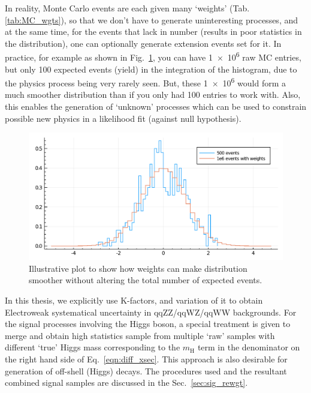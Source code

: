 In reality, Monte Carlo events are each given many `weights' (Tab. \ref{tab:MC_wgts}), so that
we don't have to generate uninteresting processes, and at the same time, for the events that lack
in number (results in poor statistics in the distribution), one can optionally generate
extension events set for it. In practice, for example as shown in Fig.~\ref{fig:wgt_demo}, 
you can have \num{1e6} raw MC entries, but only
100 expected events (yield) in the integration of the histogram, 
due to the physics process being very rarely seen. But,
these \num{1e6} would form a much smoother distribution than if you only had 100 entries to work with.
Also, this enables the generation of `unknown' processes which can
be used to constrain possible new physics in a likelihood fit (against null hypothesis).

\begin{figure}[hb]
\begin{center}
\includegraphics[width=.8\linewidth]{fig/demo_wgts.pdf}
\end{center}
\caption{Illustrative plot to show how weights can make distribution smoother without altering
the total number of expected events.}
\label{fig:wgt_demo}
\end{figure}

In this thesis, we explicitly use K-factors, and variation of it to 
obtain Electroweak systematical uncertainty in qqZZ/qqWZ/qqWW backgrounds. For the signal processes involving
the Higgs boson, a special treatment is given to merge and obtain high statistics sample from
multiple `raw' samples with different `true' Higgs mass corresponding to the $m_\mathrm{H}$ term
in the denominator on the right hand side of Eq.~\ref{eqn:diff_xsec}.
This approach is also desirable for generation of off-shell (Higgs) decays. The procedures 
used and the resultant combined signal samples are discussed in the Sec.~\ref{sec:sig_rewgt}.

